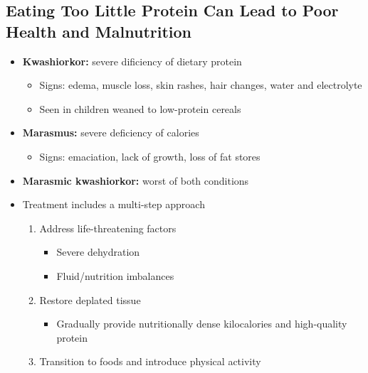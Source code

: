 \documentclass[12pt]{article}
\begin{document}
        \subsection{Eating Too Little Protein Can Lead to Poor Health and Malnutrition}
            \begin{itemize}
                \item \textbf{Kwashiorkor:} severe dificiency of dietary protein
                    \begin{itemize}
                        \item Signs: edema, muscle loss, skin rashes, hair changes, water and electrolyte
                        \item Seen in children weaned to low-protein cereals
                    \end{itemize}
                \item \textbf{Marasmus:} severe deficiency of calories
                    \begin{itemize}
                        \item Signs: emaciation, lack of growth, loss of fat stores
                    \end{itemize}
                \item \textbf{Marasmic kwashiorkor:} worst of both conditions
                \item Treatment includes a multi-step approach
                    \begin{enumerate}
                        \item Address life-threatening factors
                            \begin{itemize}
                                \item Severe dehydration
                                \item Fluid/nutrition imbalances
                            \end{itemize}
                        \item Restore deplated tissue
                            \begin{itemize}
                                \item Gradually provide nutritionally dense kilocalories and high-quality protein
                            \end{itemize}
                        \item Transition to foods and introduce physical activity
                    \end{enumerate}
            \end{itemize}
\end{document}
